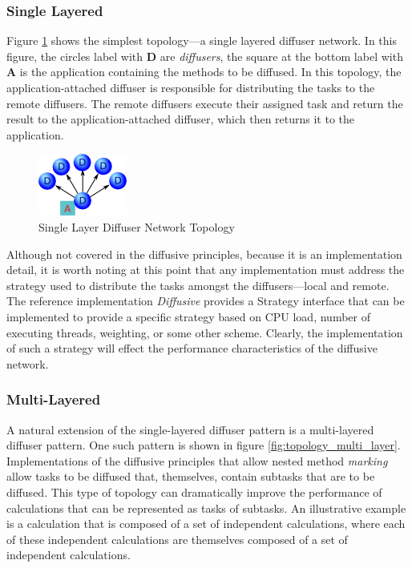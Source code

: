 \documentclass[11pt]{article}
\begin{document}
\subsubsection{Single Layered}
Figure \ref{fig:topology_single_layer} shows the simplest topology---a single layered diffuser network. In this figure, the circles label with \textbf{D} are \emph{diffusers}, the square at the bottom label with \textbf{A} is the application containing the methods to be diffused. In this topology, the application-attached diffuser is responsible for distributing the tasks to the remote diffusers. The remote diffusers execute their assigned task and return the result to the application-attached diffuser, which then returns it to the application.

\begin{figure}[htbp]
\begin{center}
\includegraphics[scale=1.0]{topology_single_layer}
\caption{Single Layer Diffuser Network Topology\label{fig:topology_single_layer}}
\end{center}
\end{figure}

Although not covered in the diffusive principles, because it is an implementation detail, it is worth noting at this point that any implementation must address the strategy used to distribute the tasks amongst the diffusers---local and remote. The reference implementation \emph{Diffusive} provides a \textsf{Strategy} interface that can be implemented to provide a specific strategy based on CPU load, number of executing threads, weighting, or some other scheme. Clearly, the implementation of such a strategy will effect the performance characteristics of the diffusive network.

\subsubsection{Multi-Layered}
A natural extension of the single-layered diffuser pattern is a multi-layered diffuser pattern. One such pattern is  shown in figure \ref{fig:topology_multi_layer}. Implementations of the diffusive principles that allow nested method \emph{marking} allow tasks to be diffused that, themselves, contain subtasks that are to be diffused. This type of topology can dramatically improve the performance of calculations that can be represented as tasks of subtasks. An illustrative example is a calculation that is composed of a set of independent calculations, where each of these independent calculations are themselves composed of a set of independent calculations. 
\end{document}
